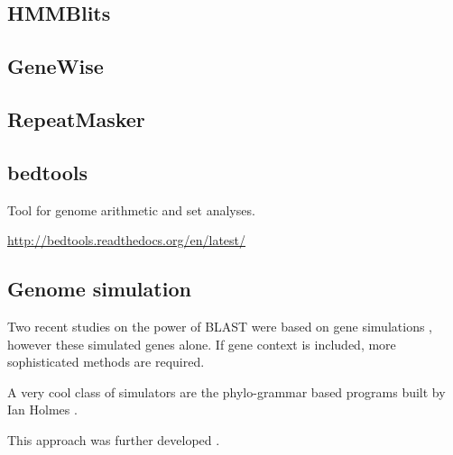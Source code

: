 \subsection{HMMBlits}

\subsection{GeneWise}

\subsection{RepeatMasker}

\subsection{bedtools}

  Tool for genome arithmetic and set analyses.

  \url{http://bedtools.readthedocs.org/en/latest/}

\subsection{Genome simulation}

  Two recent studies on the power of BLAST were based on gene simulations
  \cite{moyers_phylostratigraphic_2015,moyers_evaluating_2016}, however these
  simulated genes alone. If gene context is included, more sophisticated
  methods are required.

  A very cool class of simulators are the phylo-grammar based programs built by
  Ian Holmes \cite{klosterman_xrate:_2006}. 

  This approach was further developed \cite{westesson_developing_2012}.

